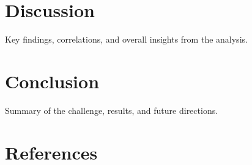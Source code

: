 \documentclass[a4paper,12pt]{article}
\begin{document}
\section{Discussion}
\label{sec:discussion}
Key findings, correlations, and overall insights from the analysis.

\section{Conclusion}
\label{sec:conclusion}
Summary of the challenge, results, and future directions.

\section*{References}
\label{sec:references}
\end{document}
